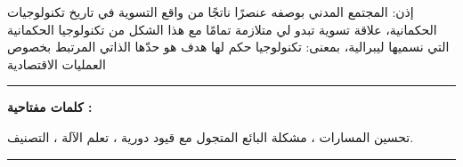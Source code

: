 \medskip

\begin{Arabic}
إذن: المجتمع المدني بوصفه عنصرًا ناتجًا من واقع التسوية في تاريخ تكنولوجيات الحكمانية، علاقة تسوية تبدو لي متلازمة تمامًا مع هذا الشكل من تكنولوجيا الحكمانية التي نسميها ليبرالية، بمعنى: تكنولوجيا حكم لها هدف هو حدّها الذاتي المرتبط بخصوص العمليات الاقتصادية
\end{Arabic}

\medskip

\vspace{3cm}

\noindent\rule[2pt]{\textwidth}{0.5pt}


\begin{Arabic}
\textbf{كلمات مفتاحية :}

تحسين المسارات ، مشكلة البائع المتجول مع قيود دورية ، تعلم الآلة ، التصنيف.

\end{Arabic}

\noindent\rule[2pt]{\textwidth}{0.5pt}

